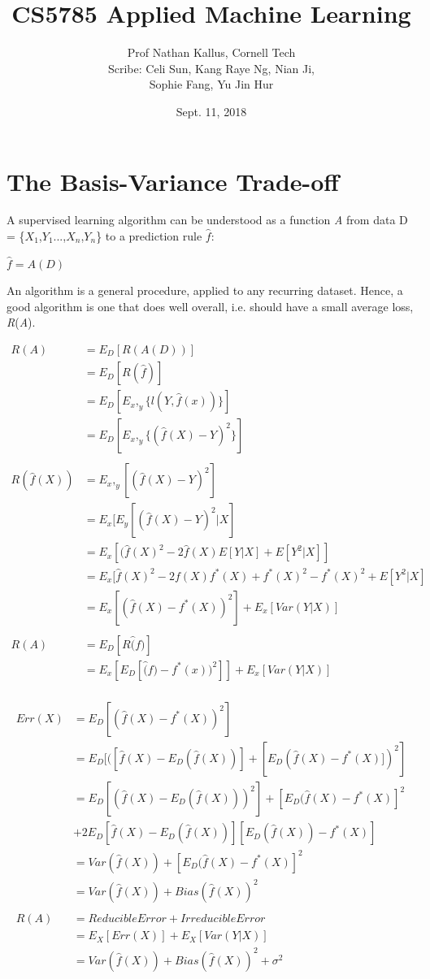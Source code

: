 \documentclass[a4paper]{article}
\title{CS5785 Applied Machine Learning}
\author{Prof Nathan Kallus, Cornell Tech\\
		Scribe: Celi Sun, Kang Raye Ng, Nian Ji,\\
        Sophie Fang, Yu Jin Hur}
\date{Sept. 11, 2018}
\begin{document}
\maketitle

\section{The Basis-Variance Trade-off}
A supervised learning algorithm can be understood as a function \textit{A} from data D = \{$X_{1}$,$Y_{1}$...,$X_{n}$,$Y_{n}$\} to a prediction rule $\hat{f}$:

\begin{center}
					$\hat{f} = \textit{A}(\textit{D})$
\end{center}

\noindent An algorithm is a general procedure, applied to any recurring dataset. Hence, a good algorithm is one that does well overall, i.e. should have a small average loss, \textit{R}(\textit{A}).

\begin{align*}
     R(A) &=E_D[R(A(D))]\\ 
     &=E_D[R(\hat{f})]\\
     &=E_D[E_x,_y\{l(Y, \hat{f}(x))\}]\\
     &=E_D[E_x,_y\{(\hat{f}(X)-Y)^2\}]\\   
	 \\
     R(\hat{f}(X)) &=E_x,_y[(\hat{f}(X)-Y)^2]\\ 
     &=E_x[E_y[(\hat{f}(X)-Y)^2|X]\\
     &=E_x[(\hat{f}(X)^2-2\hat{f}(X)E[Y|X]+E[Y^2|X]]\\
     &=E_x[\hat{f}(X)^2-2f(X)f^*(X)+f^*(X)^2-f^*(X)^2+E[Y^2|X]\\
     &=E_x[(\hat{f}(X)-f^*(X))^2]+E_x[Var(Y|X)]\\
	 \\
	 R(A) &=E_D[R\hat(f)]\\ 
     &=E_x[E_D[\hat(f)-f^*(x))^2]]+E_x[Var(Y|X)]\\
\end{align*}

\begin{align*}
	Err(X) &=E_D[(\hat{f}(X)-f^*(X))^2]\\ 
    &=E_D[([\hat{f}(X)-E_D(\hat{f}(X))]+[E_D(\hat{f}(X)-f^*(X)])^2]\\
    &=E_D[(\hat{f}(X)-E_D(\hat{f}(X)))^2]+[E_D(\hat{f}(X)-f^*(X)]^2\\
    &  +2E_D[\hat{f}(X)-E_D(\hat{f}(X))][E_D(\hat{f}(X))-f^*(X)]\\
    &=Var(\hat{f}(X))+[E_D(\hat{f}(X)-f^*(X)]^2\\
    &=Var(\hat{f}(X))+Bias(\hat{f}(X))^2\\
     \\
    R(A) &= Reducible Error + Irreducible Error\\
    &=E_X[Err(X)]+E_X[Var(Y|X)]\\
    &=Var(\hat{f}(X))+Bias(\hat{f}(X))^2+\sigma^2\\
\end{align*}
\end{document}
